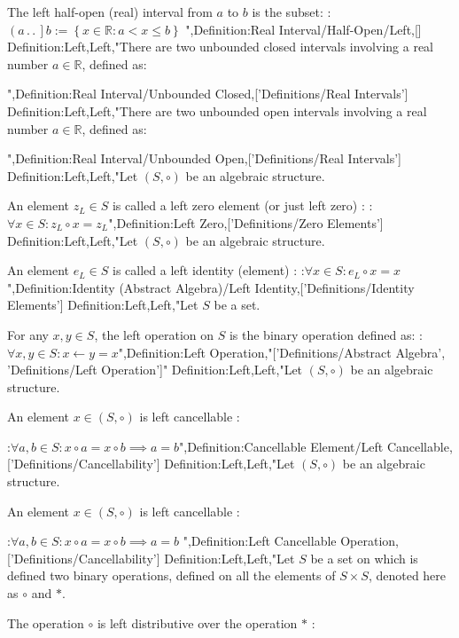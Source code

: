 The left half-open (real) interval from $a$ to $b$ is the subset:
:$\left( a \,.\,.\,   \right]b := \left\lbrace x \in \mathbb R: a < x \le b \right\rbrace$
",Definition:Real Interval/Half-Open/Left,[]
Definition:Left,Left,"There are two unbounded closed intervals involving a real number $a \in \mathbb R$, defined as:




",Definition:Real Interval/Unbounded Closed,['Definitions/Real Intervals']
Definition:Left,Left,"There are two unbounded open intervals involving a real number $a \in \mathbb R$, defined as:




",Definition:Real Interval/Unbounded Open,['Definitions/Real Intervals']
Definition:Left,Left,"Let $\left( S, \circ \right)$ be an algebraic structure.

An element $z_L \in S$ is called a left zero element (or just left zero) :
:$\forall x \in S: z_L \circ x = z_L$",Definition:Left Zero,['Definitions/Zero Elements']
Definition:Left,Left,"Let $\left( S, \circ \right)$ be an algebraic structure.

An element $e_L \in S$ is called a left identity (element) :
:$\forall x \in S: e_L \circ x = x$
",Definition:Identity (Abstract Algebra)/Left Identity,['Definitions/Identity Elements']
Definition:Left,Left,"Let $S$ be a set.

For any $x, y \in S$, the left operation on $S$ is the binary operation defined as:
:$\forall x, y \in S: x \gets y = x$",Definition:Left Operation,"['Definitions/Abstract Algebra', 'Definitions/Left Operation']"
Definition:Left,Left,"Let $\left( S, \circ \right)$ be an algebraic structure.


An element $x \in \left( S, \circ \right)$ is left cancellable :

:$\forall a, b \in S: x \circ a = x \circ b \implies a = b$",Definition:Cancellable Element/Left Cancellable,['Definitions/Cancellability']
Definition:Left,Left,"Let $\left( S, \circ \right)$ be an algebraic structure.


An element $x \in \left( S, \circ \right)$ is left cancellable :

:$\forall a, b \in S: x \circ a = x \circ b \implies a = b$
",Definition:Left Cancellable Operation,['Definitions/Cancellability']
Definition:Left,Left,"Let $S$ be a set on which is defined two binary operations, defined on all the elements of $S \times S$, denoted here as $\circ$ and $*$.

The operation $\circ$ is left distributive over the operation $*$ :

